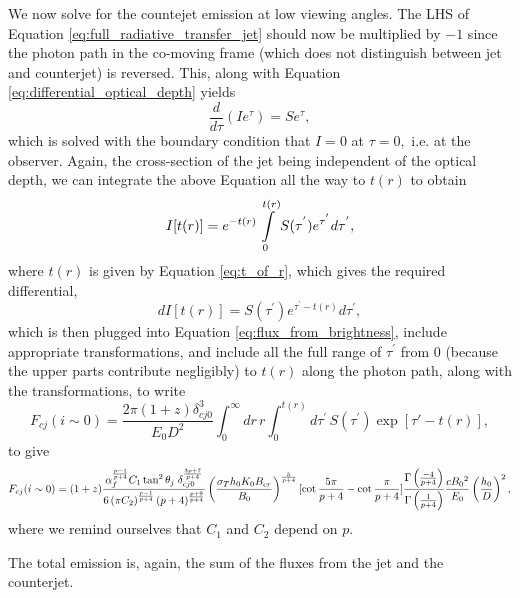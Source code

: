 We now solve for the countejet emission at low viewing angles. The LHS of Equation \ref{eq:full_radiative_transfer_jet} should now be multiplied by $ -1 $ since the photon path in the co-moving frame (which does not distinguish between jet and counterjet) is reversed. This, along with Equation \ref{eq:differential_optical_depth} yields
\begin{equation}
\dfrac{d}{d\tau}(I e^{\tau}) = S e^{\tau}, \label{eq:radiative_transfer_equation_for_counterjet}
\end{equation}
which is solved with the boundary condition that $ I = 0 $ at $ \tau = 0, $ i.e. at the observer. Again, the cross-section of the jet being independent of the optical depth, we can integrate the above Equation all the way to $ t(r) $ to obtain
\begin{equation}
I[t(r)] = e^{-t(r)} \intop_{0}^{t(r)} S(\tau^{'}) e^{\tau^{'}} d\tau^{'}, \label{eq:brightness_profile_of_counterjet}
\end{equation}
where $ t(r) $ is given by Equation \ref{eq:t_of_r}, which gives the required differential,
\begin{equation}
dI[t(r)] = S(\tau^{'}) e^{\tau^{'} - t(r)} d\tau^{'},
\end{equation}
which is then plugged into Equation  \ref{eq:flux_from_brightness}, include appropriate transformations, and include all the full range of $ \tau^{'} $ from $ 0 $ (because the upper parts contribute negligibly) to $ t(r) $  along the photon path, along with the transformations, to write
\begin{equation}
F_{cj} (i \sim 0) = \dfrac{2 \pi (1+z) \delta_{cj0}^3}{E_0 D^2} \int_{0}^{\infty} dr\, r \int_{0}^{t(r)} d\tau^{'} \, S(\tau^{'}) \exp[\tau'-t(r)],
\label{eq:counterjet_flux_integral}
\end{equation}
to give
\begin{equation}
F_{cj} (i \sim 0) = (1+z) \dfrac{ \alpha_f^{\frac{p-1}{p+4} } C_1 \tan ^2 \theta_j \; \delta_{cj0}^{\frac{3p+7}{p+4}} }{ 6 \left(\pi C_2 \right)^{\frac{p-1}{p+4}} (p+4)^{\frac{p+9}{p+4}} }\left(\dfrac{ \sigma_T h_0 K_0 B_{cr}}{B_0}\right)^{\frac{5}{p+4}} [ \cot{5\pi\over p+4} - \cot{\pi\over p+4} ] \dfrac{\Gamma\left(\frac{-4}{p+4}\right)}{\Gamma\left(\frac{1}{p+4}\right)} \frac{ c B_0{^2} }{E_0} \left(\frac{h_0}{D}\right)^2, \label{eq:Flux_counterjet_on_axis}
\end{equation}
where we remind ourselves that $ C_1 $ and $ C_2 $ depend on $ p . $

The total emission is, again, the sum of the fluxes from the jet and the counterjet.

